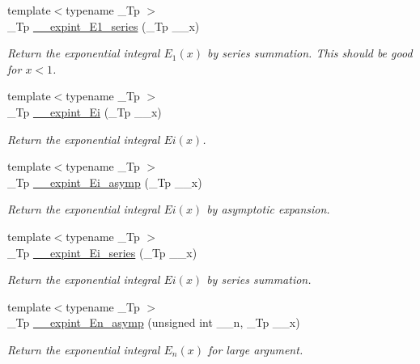 \begin{DoxyCompactItemize}
{\footnotesize template$<$typename \+\_\+\+Tp $>$ }\\\+\_\+\+Tp \hyperlink{namespacestd_1_1____detail_ad162f66405bde5ccd5a7cdabbe1966f7}{\+\_\+\+\_\+expint\+\_\+\+E1\+\_\+series} (\+\_\+\+Tp \+\_\+\+\_\+x)
\begin{DoxyCompactList}\small\item\em Return the exponential integral $ E_1(x) $ by series summation. This should be good for $ x < 1 $. \end{DoxyCompactList}\item 
{\footnotesize template$<$typename \+\_\+\+Tp $>$ }\\\+\_\+\+Tp \hyperlink{namespacestd_1_1____detail_ab2f8bf37caa4993de28306a2a634ed6f}{\+\_\+\+\_\+expint\+\_\+\+Ei} (\+\_\+\+Tp \+\_\+\+\_\+x)
\begin{DoxyCompactList}\small\item\em Return the exponential integral $ Ei(x) $. \end{DoxyCompactList}\item 
{\footnotesize template$<$typename \+\_\+\+Tp $>$ }\\\+\_\+\+Tp \hyperlink{namespacestd_1_1____detail_ac272ec880c6d4be02b56089a1cebc46d}{\+\_\+\+\_\+expint\+\_\+\+Ei\+\_\+asymp} (\+\_\+\+Tp \+\_\+\+\_\+x)
\begin{DoxyCompactList}\small\item\em Return the exponential integral $ Ei(x) $ by asymptotic expansion. \end{DoxyCompactList}\item 
{\footnotesize template$<$typename \+\_\+\+Tp $>$ }\\\+\_\+\+Tp \hyperlink{namespacestd_1_1____detail_a7582d1305e84e0263cc6ec2a00a2bf7d}{\+\_\+\+\_\+expint\+\_\+\+Ei\+\_\+series} (\+\_\+\+Tp \+\_\+\+\_\+x)
\begin{DoxyCompactList}\small\item\em Return the exponential integral $ Ei(x) $ by series summation. \end{DoxyCompactList}\item 
{\footnotesize template$<$typename \+\_\+\+Tp $>$ }\\\+\_\+\+Tp \hyperlink{namespacestd_1_1____detail_a3b9f1cc6d66cbd705f52c520eb96b467}{\+\_\+\+\_\+expint\+\_\+\+En\+\_\+asymp} (unsigned int \+\_\+\+\_\+n, \+\_\+\+Tp \+\_\+\+\_\+x)
\begin{DoxyCompactList}\small\item\em Return the exponential integral $ E_n(x) $ for large argument. \end{DoxyCompactList}\item 

\end{DoxyCompactItemize}
